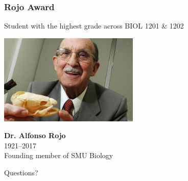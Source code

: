 \documentclass[10pt]{beamer}
\begin{document}
\begin{frame}[t]
\frametitle{Rojo Award}

	\begin{center}
		Student with the highest grade across BIOL 1201 \& 1202
		
		\vspace{0.5cm}
		
		\includegraphics[width=0.5\textwidth]{figures/Rojo.jpg}
		
		\textbf{Dr. Alfonso Rojo}\\
		1921--2017\\
		Founding member of SMU Biology\\
	\end{center}

\end{frame}

\begin{frame}
	\begin{center}
		\Huge{\textcolor{myblue}{Questions?}}
	\end{center}	
\end{frame}
	
\end{document}
